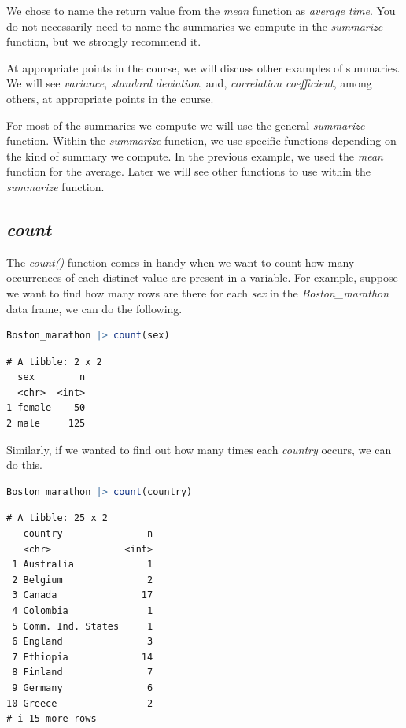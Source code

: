 \documentclass[
  12pt,
  letterpaper,
  DIV=11,
  numbers=noendperiod]{scrreprt}
\begin{document}
We chose to name the return value from the \emph{mean} function as
\emph{average time}. You do not necessarily need to name the summaries
we compute in the \emph{summarize} function, but we strongly recommend
it.

At appropriate points in the course, we will discuss other examples of
summaries. We will see \emph{variance}, \emph{standard deviation}, and,
\emph{correlation coefficient}, among others, at appropriate points in
the course.

For most of the summaries we compute we will use the general
\emph{summarize} function. Within the \emph{summarize} function, we use
specific functions depending on the kind of summary we compute. In the
previous example, we used the \emph{mean} function for the average.
Later we will see other functions to use within the \emph{summarize}
function.

\subsection{\texorpdfstring{\emph{count}}{count}}\label{count}

The \emph{count()} function comes in handy when we want to count how
many occurrences of each distinct value are present in a variable. For
example, suppose we want to find how many rows are there for each
\emph{sex} in the \emph{Boston\_marathon} data frame, we can do the
following.

\begin{lstlisting}[language=R]
Boston_marathon |> count(sex)
\end{lstlisting}

\begin{lstlisting}
# A tibble: 2 x 2
  sex        n
  <chr>  <int>
1 female    50
2 male     125
\end{lstlisting}

Similarly, if we wanted to find out how many times each \emph{country}
occurs, we can do this.

\begin{lstlisting}[language=R]
Boston_marathon |> count(country)
\end{lstlisting}

\begin{lstlisting}
# A tibble: 25 x 2
   country               n
   <chr>             <int>
 1 Australia             1
 2 Belgium               2
 3 Canada               17
 4 Colombia              1
 5 Comm. Ind. States     1
 6 England               3
 7 Ethiopia             14
 8 Finland               7
 9 Germany               6
10 Greece                2
# i 15 more rows
\end{lstlisting}
\end{document}
